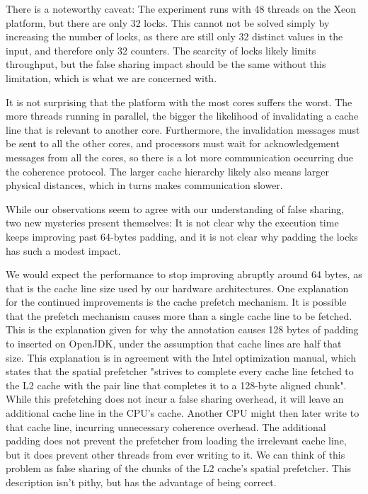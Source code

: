 There is a noteworthy caveat: The experiment runs with 48 threads on the Xeon
platform, but there are only 32 locks.
This cannot not be solved simply by increasing the
number of locks, as there are still only 32 distinct values in the input, and
therefore only 32 counters.
The scarcity of locks likely limits
throughput, but the false sharing impact should be the same without
this limitation, which is what we are concerned with.

It is not surprising that the platform with the most cores suffers the worst.
The more threads running in parallel, the bigger the likelihood of invalidating
a cache line that is relevant to another core. Furthermore, the invalidation
messages must be sent to all the other cores, and processors must wait for
acknowledgement messages from all the cores, so there is a lot more
communication occurring due the coherence protocol. The larger cache hierarchy
likely also means larger physical distances, which in turns makes communication
slower.

While our observations seem to agree with our understanding of false sharing,
two new mysteries present themselves: It is not clear why the execution time
keeps improving past 64-bytes padding, and it is not clear why padding the locks
has such a modest impact.

We would expect the performance to stop improving abruptly around 64
bytes, as that is the cache line size used by our hardware architectures.
One explanation for the continued improvements is the cache prefetch mechanism.
It is possible that the prefetch mechanism causes more than a single cache line
to be fetched. This is the explanation given for why the 
annotation causes 128 bytes of padding to inserted on OpenJDK, under the
assumption that cache lines are half that size\cite{openjdkmailcontended}.
This explanation is in agreement with the Intel optimization
manual\cite{inteloptimize}, which states that the spatial prefetcher
"strives to complete every cache line fetched to the L2 cache with the pair line
that completes it to a 128-byte aligned chunk"\footnotemark. While this
prefetching does not incur a false sharing overhead, it will leave an additional
cache line in the CPU's cache. Another CPU might then later write to that
cache line, incurring unnecessary coherence overhead. The additional padding
does not prevent the prefetcher from loading the irrelevant cache line, but it
does prevent other threads from ever writing to it. We can think of this problem
as false sharing of the chunks of the L2 cache's spatial prefetcher. This
description isn't pithy, but has the advantage of being correct.

